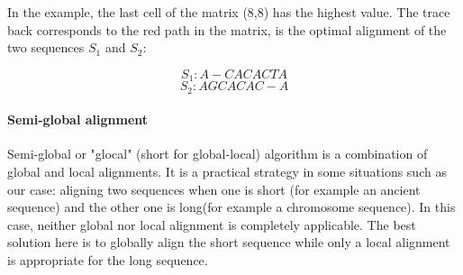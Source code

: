 \documentclass[11pt,a4paper]{report}
\begin{document}
In the example, the last cell of the matrix (8,8) has the highest value. The trace back corresponds to the red path in the matrix, is the optimal alignment of the two sequences $S_{1}$ and $S_{2}$: 

$$S_{1}:A-CACACTA$$
$$S_{2}:AGCACAC-A$$



\paragraph{Semi-global alignment}

Semi-global or "glocal" (short for global-local) algorithm is a combination of global and local alignments. It is a practical strategy in some situations such as our case: aligning two sequences when one is short (for example an ancient sequence) and the other one is long(for example a chromosome sequence). In this case, neither global nor local alignment is completely applicable. The best solution here is to globally align the short sequence while only a local alignment is appropriate for the long sequence.



\end{document}
